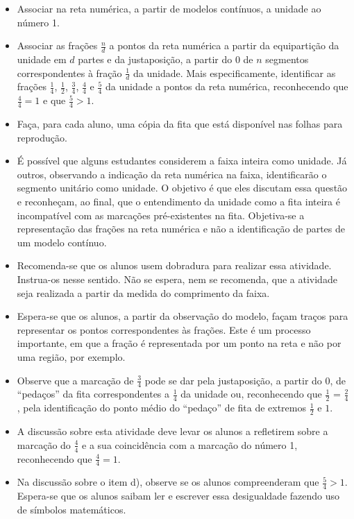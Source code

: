 \begin{atividade}\label{chap3-ativ6}
\objetivos
\begin{itemize} %
    \item       Associar na reta numérica, a partir de modelos contínuos, a unidade ao número 1.
    \item       Associar as frações $\frac{n}{d}$ a pontos da reta numérica a partir da equipartição da unidade em $d$ partes e da justaposição, a partir do  $0$ de $n$ segmentos correspondentes à fração $\frac{1}{d}$ da unidade. Mais especificamente, identificar as frações $\frac{1}{4}$, $\frac{1}{2}$, $\frac{3}{4}$, $\frac{4}{4}$ e $\frac{5}{4}$ da unidade a pontos da reta numérica, reconhecendo que $\frac{4}{4}=1$ e que $\frac{5}{4}>1$.
\end{itemize} %

\discussoes
\begin{itemize} %
    \item       Faça, para cada aluno, uma cópia da fita que está disponível nas folhas para reprodução.
    \item       É possível que alguns estudantes considerem a faixa inteira como unidade. Já outros, observando a indicação da reta numérica na faixa, identificarão o segmento unitário como unidade. O objetivo é que eles discutam essa questão e reconheçam, ao final, que o entendimento da unidade como a fita inteira é incompatível com as marcações pré-existentes na fita. Objetiva-se a representação das frações na reta numérica e não a identificação de partes de um modelo contínuo.
    \item       Recomenda-se que os alunos usem dobradura para realizar essa atividade. Instrua-os nesse sentido. Não se espera, nem se recomenda, que a atividade seja realizada a partir da medida do comprimento da faixa.
    \item       Espera-se que os alunos, a partir da observação do modelo, façam traços para representar os pontos correspondentes às frações. Este é um processo importante, em que a fração é representada por um ponto na reta e não por uma região, por exemplo.
    \item       Observe que a marcação de       $\frac{3}{4}$       pode se dar pela justaposição, a partir do       $0$, de       ``pedaços''       da fita correspondentes a       $\frac{1}{4}$       da unidade ou, reconhecendo que       $\frac{1}{2}$       =       $\frac{2}{4}$, pela identificação do ponto médio do       ``pedaço''       de fita de extremos       $\frac{1}{2}$       e       $1$.
    \item A discussão sobre esta atividade deve levar os alunos a refletirem sobre a marcação do $\frac{4}{4}$ e a sua coincidência com a marcação do número 1, reconhecendo que $\frac{4}{4}=1$.
    \item Na discussão sobre o item d), observe se os alunos compreenderam que       $\frac{5}{4}>1$. Espera-se que os alunos saibam ler e escrever essa desigualdade fazendo uso de símbolos matemáticos.
\end{itemize} %


\end{atividade}
